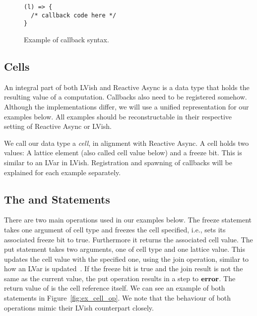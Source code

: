 \begin{figure}
  \centering
  \begin{minipage}{0.763\textwidth}
    \begin{lstlisting}[]
(l) => {
  /* callback code here */
}
    \end{lstlisting}
  \end{minipage}
  \caption{Example of callback syntax.}
  \label{fig:callback_syntax}
\end{figure}

\subsection{Cells}%
\label{sub:cells}

An integral part of both LVish and Reactive Async is a data type that holds 
the resulting value of a computation. Callbacks also need to be
registered somehow. Although the implementations differ, we will
use a unified representation for our examples below. All examples should be
reconstructable in their respective setting of Reactive Async or LVish.

We call our data type a \emph{cell}, in alignment with Reactive Async. A cell
holds two values: A lattice element (also called cell value below) and a freeze bit.
This is similar to an LVar in LVish. Registration and spawning of callbacks will
be explained for each example separately.

\subsection{The  and  Statements}%
\label{sub:the_put_statement}

There are two main operations used in our examples below. The freeze
statement  takes one argument of cell type and freezes the cell
specified, i.e., sets its associated freeze bit to true. Furthermore it returns
the associated cell value. The put statement  takes two arguments,
one of cell type and one lattice value. This updates the cell value with the
specified one, using the join operation, similar to how an LVar is
updated~\parencite{kuper2013lvars}. If the freeze bit is true and the join
result is not the same as the current value, the put operation results in a step
to $\mbox{{\bf error}}$. The return value of  is the cell reference itself. We can
see an example of both statements in Figure~\ref{fig:ex_cell_op}. We note that
the behaviour of both operations mimic their LVish counterpart closely.


